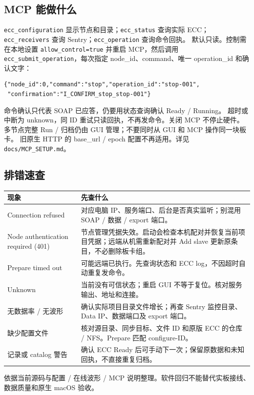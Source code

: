 \documentclass[11pt,a4paper]{article}
\newcommand{\code}[1]{\texttt{#1}}
\begin{document}
\subsection*{MCP 能做什么}
\code{ecc\_configuration} 显示节点和目录；\code{ecc\_status} 查询实际 ECC；
\code{ecc\_receivers} 查询 Sentry；\code{ecc\_operation} 查询命令回执。
默认只读。控制需在本地设置 \code{allow\_control=true} 并重启 MCP，然后调用
\code{ecc\_submit\_operation}，每次指定 node\_id、command、唯一 operation\_id 和确认文字：
\begin{verbatim}
{"node_id":0,"command":"stop","operation_id":"stop-001",
 "confirmation":"I_CONFIRM_stop_stop-001"}
\end{verbatim}
命令确认只代表 SOAP 已应答，仍要用状态查询确认 Ready / Running。
超时或中断为 unknown，同 ID 重试只读回执，不再发命令。关闭 MCP 不停止硬件。
多节点完整 Run / 归档仍由 GUI 管理；不要同时从 GUI 和 MCP 操作同一块板卡。
旧原生 HTTP 的 base\_url / epoch 配置不再适用。详见 \code{docs/MCP\_SETUP.md}。
\subsection*{排错速查}
\par\smallskip\noindent\begin{tabularx}{\linewidth}{@{}L{39mm}Y@{}}\toprule
现象 & 先查什么 \\\midrule
Connection refused & 对应电脑 IP、服务端口、后台是否真实监听；别混用 SOAP / 数据 / export 端口。\\
Node authentication required (401) & 节点管理凭据失效。启动会检查本机配对并恢复当前项目凭据；远端从机需重新配对并 Add slave 更新原条目，不必删除板卡组。\\
Prepare timed out & 可能远端已执行。先查询状态和 ECC log，不因超时自动重复发命令。\\
Unknown & 当前没有可信状态；重启 GUI 不等于复位。核对服务输出、地址和连接。\\
无数据率 / 无波形 & 确认实际项目目录文件增长；再查 Sentry 监控目录、Data IP、数据端口及 export 端口。\\
缺少配置文件 & 核对源目录、同步目标、文件 ID 和原版 ECC 的仓库 / NFS。Prepare 匹配 configure-ID。\\
记录或 catalog 警告 & 确认 ECC Ready 后可手动下一次；保留原数据和未知回执，不直接重复归档。\\\bottomrule
\end{tabularx}\par\smallskip
\vfill
{\footnotesize\color{muted}依据当前源码与配置 / 在线波形 / MCP 说明整理。软件回归不能替代实板接线、数据质量和原生 macOS 验收。}

\label{guide-last}
\end{document}
